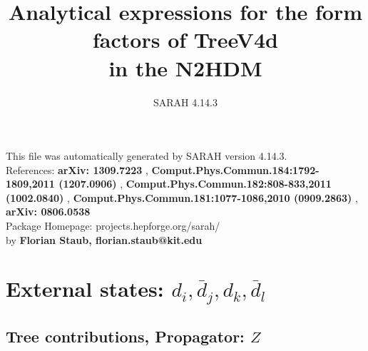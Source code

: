 \documentclass[A4,landscape]{article}
\begin{document}
\title{Analytical expressions for the form factors of TreeV4d\\ in the N2HDM } 
 \author{SARAH 4.14.3} 
 \maketitle 
 \vspace{10cm} 
This file was automatically generated by SARAH version 4.14.3.  \\ 
References: {\bf arXiv: 1309.7223 }, {\bf Comput.Phys.Commun.184:1792-1809,2011 (1207.0906) }, {\bf Comput.Phys.Commun.182:808-833,2011 (1002.0840) }, {\bf Comput.Phys.Commun.181:1077-1086,2010 (0909.2863) }, {\bf arXiv: 0806.0538 } \\ 
Package Homepage: projects.hepforge.org/sarah/ \\ 
by {\bf Florian Staub, florian.staub@kit.edu} 
 \pagebreak 
 \tableofcontents 
 \pagebreak 
\section{External states: ${d_{{i}}, \bar{d}_{{j}}, d_{{k}}, \bar{d}_{{l}}}$} 
\subsection{Tree contributions, Propagator: $Z$} 
\end{document}
